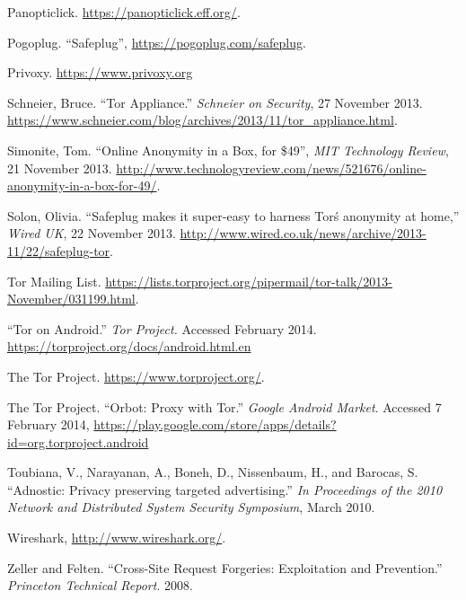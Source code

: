 \documentclass[conference]{IEEEtran}
\begin{document}
\begin{thebibliography}{1}
 Panopticlick. \url{https://panopticlick.eff.org/}.

 Pogoplug. ``Safeplug'', \url{https://pogoplug.com/safeplug}.

 Privoxy. \url{https://www.privoxy.org}

 Schneier, Bruce. ``Tor Appliance.'' \emph{Schneier on Security}, 27 November 2013. \url{https://www.schneier.com/blog/archives/2013/11/tor_appliance.html}.

 Simonite, Tom. ``Online Anonymity in a Box, for \$49'', \emph{MIT Technology Review}, 21 November 2013. \url{http://www.technologyreview.com/news/521676/online-anonymity-in-a-box-for-49/}.

 Solon, Olivia. ``Safeplug makes it super-easy to harness Tor\'s anonymity at home,'' \emph{Wired UK}, 22 November 2013. \url{http://www.wired.co.uk/news/archive/2013-11/22/safeplug-tor}.

 Tor Mailing List.  \url{https://lists.torproject.org/pipermail/tor-talk/2013-November/031199.html}.

 ``Tor on Android.'' \emph{Tor Project.} Accessed February 2014. \url{https://torproject.org/docs/android.html.en}

 The Tor Project.  \url{https://www.torproject.org/}.

 The Tor Project. ``Orbot: Proxy with Tor.'' \emph{Google Android Market}. Accessed 7 February 2014, \url{https://play.google.com/store/apps/details?id=org.torproject.android}

 Toubiana, V., Narayanan, A., Boneh, D., Nissenbaum, H., and Barocas, S. ``Adnostic: Privacy preserving targeted advertising.'' \emph{In Proceedings of the 2010 Network and Distributed System Security Symposium}, March 2010.

 Wireshark, \url{http://www.wireshark.org/}. 

 Zeller and Felten. ``Cross-Site Request Forgeries: Exploitation and Prevention.'' \emph{Princeton Technical Report}. 2008.


\end{thebibliography}




\end{document}
